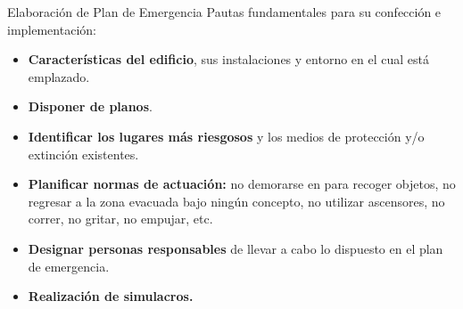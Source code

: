 \begin{frame}{Elaboración de Plan de Emergencia}
  \small
  Pautas fundamentales para su confección e implementación:
  \vspace{0.3cm}
  \begin{itemize}
    \small
    \setlength{\itemsep}{0.28cm}
    \item \textbf{Características del edificio}, sus instalaciones y entorno en el cual está emplazado.
    \item \textbf{Disponer de planos}.
    \item \textbf{Identificar los lugares más riesgosos} y los medios de protección y/o extinción existentes.
    \item \textbf{Planificar normas de actuación:} no demorarse en para recoger
        objetos, no regresar a la zona evacuada bajo ningún concepto, no
          utilizar ascensores, no correr, no gritar, no empujar, etc.
    \item \textbf{Designar personas responsables} de llevar a cabo lo dispuesto en el plan de emergencia.
    \item \textbf{Realización de simulacros.}
  \end{itemize}
\end{frame}

